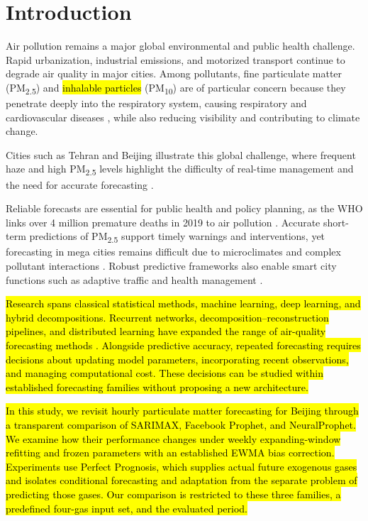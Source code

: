 \documentclass[pdflatex,sn-basic,Numbered]{sn-jnl}
\newcommand{\rev}[1]{\hl{#1}}
\begin{document}
\section{Introduction}\label{sec1}

Air pollution remains a major global environmental and public health challenge. Rapid urbanization, industrial emissions, and motorized transport continue to degrade air quality in major cities. Among pollutants, fine particulate matter (PM\textsubscript{2.5}) and \rev{inhalable particles} (PM\textsubscript{10}) are of particular concern because they penetrate deeply into the respiratory system, causing respiratory and cardiovascular diseases \citep{bib1}, while also reducing visibility and contributing to climate change.

Cities such as Tehran and Beijing illustrate this global challenge, where frequent haze and high PM\textsubscript{2.5} levels highlight the difficulty of real-time management and the need for accurate forecasting \citep{bib2,bib3}.

Reliable forecasts are essential for public health and policy planning, as the WHO links over 4 million premature deaths in 2019 to air pollution \citep{bib1}. Accurate short-term predictions of PM\textsubscript{2.5} support timely warnings and interventions, yet forecasting in mega cities remains difficult due to microclimates and complex pollutant interactions \citep{bib4}. Robust predictive frameworks also enable smart city functions such as adaptive traffic and health management \citep{bib4,bib5}.

\rev{Research spans classical statistical methods, machine learning, deep learning, and hybrid decompositions. Recurrent networks, decomposition--reconstruction pipelines, and distributed learning have expanded the range of air-quality forecasting methods \citep{bib5,bib6,bib7,bib9,bib10,bib11}. Alongside predictive accuracy, repeated forecasting requires decisions about updating model parameters, incorporating recent observations, and managing computational cost. These decisions can be studied within established forecasting families without proposing a new architecture.}

\rev{In this study, we revisit hourly particulate matter forecasting for Beijing through a transparent comparison of SARIMAX, Facebook Prophet, and NeuralProphet. We examine how their performance changes under weekly expanding-window refitting and frozen parameters with an established EWMA bias correction. Experiments use Perfect Prognosis, which supplies actual future exogenous gases and isolates conditional forecasting and adaptation from the separate problem of predicting those gases. Our comparison is restricted to these three families, a predefined four-gas input set, and the evaluated period.}
\end{document}
